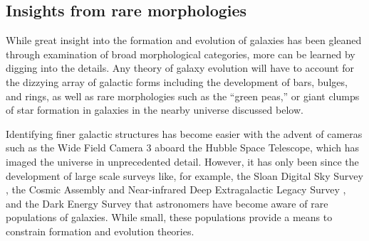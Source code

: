


\subsection{Insights from rare morphologies}

While great insight into the formation and evolution of galaxies has been gleaned through examination of broad morphological categories, more can be learned by digging into the details. Any theory of galaxy evolution will have to account for the dizzying array of galactic forms including the development of bars, bulges, and rings, as well as rare morphologies such as the ``green peas,'' or giant clumps of star formation in galaxies in the nearby universe discussed below.

Identifying finer galactic structures has become easier with the advent of cameras such as the Wide Field Camera 3 \citep{Dressel2012} aboard the Hubble Space Telescope, which has imaged the universe in unprecedented detail. However, it has only been since the development of large scale surveys like, for example, the Sloan Digital Sky Survey \citep[SDSS,][]{York2000,Abazajian2003}, the Cosmic Assembly and Near-infrared Deep Extragalactic Legacy Survey \citep[CANDELS,][]{Grogin2011,Koekemoer2011}, and the Dark Energy Survey \citep[DES,][]{DES2005} that astronomers have become aware of rare populations of galaxies. While small, these populations provide a means to constrain formation and evolution theories. 

